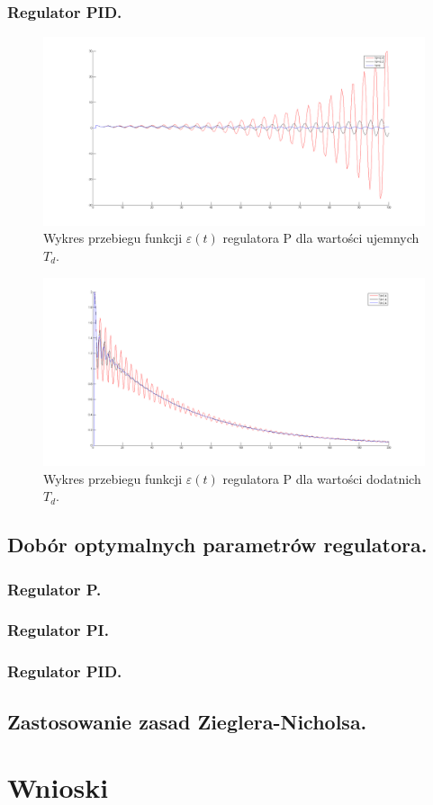 \documentclass[a4paper,10pt]{article}
\begin{document}
\subsubsection{Regulator PID.}
\begin{figure}[!h]
    \centering
	\includegraphics[width=120mm]{CW2-regulatorPID-eu.png}
	\caption{Wykres przebiegu funkcji $\varepsilon(t)$ regulatora P dla wartości ujemnych $T_{d}$.}
    \label{fig:regulatorPeu}
\end{figure}
\begin{figure}[!h]
    \centering
	\includegraphics[width=120mm]{CW2-regulatorPID-ed.png}
	\caption{Wykres przebiegu funkcji $\varepsilon(t)$ regulatora P dla wartości dodatnich $T_{d}$.}
    \label{fig:regulatorPed}
\end{figure}

\subsection{Dobór optymalnych parametrów regulatora.}\label{sec:zad2}
\subsubsection{Regulator P.}
\subsubsection{Regulator PI.}
\subsubsection{Regulator PID.}
\subsection{Zastosowanie zasad Zieglera-Nicholsa.}\label{sec:zad3}

\section{Wnioski}
\end{document}
